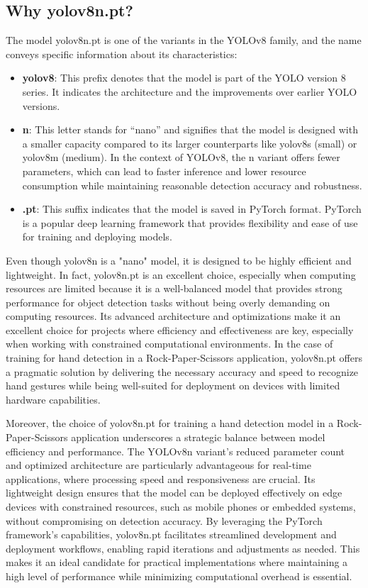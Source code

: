 \documentclass[../main]{subfiles}
\begin{document}
\subsection{Why yolov8n.pt?}
The model yolov8n.pt is one of the variants in the YOLOv8 family, and the name conveys specific information about its characteristics:
\begin{itemize}
\item[\textbullet] \textbf{yolov8}: This prefix denotes that the model is part of the YOLO version 8 series. It indicates the architecture and the improvements over earlier YOLO versions.
\item[\textbullet] \textbf{n}: This letter stands for “nano” and signifies that the model is designed with a smaller capacity compared to its larger counterparts like yolov8s (small) or yolov8m (medium). In the context of YOLOv8, the n variant offers fewer parameters, which can lead to faster inference and lower resource consumption while maintaining reasonable detection accuracy and robustness.
\item[\textbullet] \textbf{.pt}: This suffix indicates that the model is saved in PyTorch format. PyTorch is a popular deep learning framework that provides flexibility and ease of use for training and deploying models.
\end{itemize}
Even though yolov8n is a "nano" model, it is designed to be highly efficient and lightweight. In fact, yolov8n.pt is an excellent choice, especially when computing resources are limited because it is a well-balanced model that provides strong performance for object detection tasks without being overly demanding on computing resources. Its advanced architecture and optimizations make it an excellent choice for projects where efficiency and effectiveness are key, especially when working with constrained computational environments. In the case of training for hand detection in a Rock-Paper-Scissors application, yolov8n.pt offers a pragmatic solution by delivering the necessary accuracy and speed to recognize hand gestures while being well-suited for deployment on devices with limited hardware capabilities.

Moreover, the choice of yolov8n.pt for training a hand detection model in a Rock-Paper-Scissors application underscores a strategic balance between model efficiency and performance. The YOLOv8n variant’s reduced parameter count and optimized architecture are particularly advantageous for real-time applications, where processing speed and responsiveness are crucial. Its lightweight design ensures that the model can be deployed effectively on edge devices with constrained resources, such as mobile phones or embedded systems, without compromising on detection accuracy. By leveraging the PyTorch framework’s capabilities, yolov8n.pt facilitates streamlined development and deployment workflows, enabling rapid iterations and adjustments as needed. This makes it an ideal candidate for practical implementations where maintaining a high level of performance while minimizing computational overhead is essential.
\end{document}
